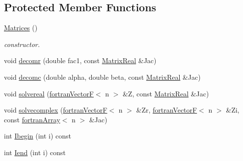 \subsection*{Protected Member Functions}
\begin{DoxyCompactItemize}
\item 
\hyperlink{classodes_1_1Matrices_3_01false_00_01true_00_01n_00_01nsub_00_01nsup_01_4_aceb158d0871ec7d9a8a739dfb202545b}{Matrices} ()
\begin{DoxyCompactList}\small\item\em constructor. \end{DoxyCompactList}\item 
void \hyperlink{classodes_1_1Matrices_3_01false_00_01true_00_01n_00_01nsub_00_01nsup_01_4_a5570c10a9d52c573ef39c23a315a93e2}{decomr} (double fac1, const \hyperlink{classodes_1_1Matrices_3_01false_00_01true_00_01n_00_01nsub_00_01nsup_01_4_a63af1e92e4c06d6986909d7af6a9c0b9}{Matrix\-Real} \&Jac)
\item 
void \hyperlink{classodes_1_1Matrices_3_01false_00_01true_00_01n_00_01nsub_00_01nsup_01_4_a15d008b4bfcf95664aaa7ae4e9407a97}{decomc} (double alpha, double beta, const \hyperlink{classodes_1_1Matrices_3_01false_00_01true_00_01n_00_01nsub_00_01nsup_01_4_a63af1e92e4c06d6986909d7af6a9c0b9}{Matrix\-Real} \&Jac)
\item 
void \hyperlink{classodes_1_1Matrices_3_01false_00_01true_00_01n_00_01nsub_00_01nsup_01_4_afc5be522ad79bd8355612626428ff493}{solvereal} (\hyperlink{classodes_1_1fortranVectorF}{fortran\-Vector\-F}$<$ n $>$ \&Z, const \hyperlink{classodes_1_1Matrices_3_01false_00_01true_00_01n_00_01nsub_00_01nsup_01_4_a63af1e92e4c06d6986909d7af6a9c0b9}{Matrix\-Real} \&Jac)
\item 
void \hyperlink{classodes_1_1Matrices_3_01false_00_01true_00_01n_00_01nsub_00_01nsup_01_4_a445a775dd02c735734a64f82426de56d}{solvecomplex} (\hyperlink{classodes_1_1fortranVectorF}{fortran\-Vector\-F}$<$ n $>$ \&Zr, \hyperlink{classodes_1_1fortranVectorF}{fortran\-Vector\-F}$<$ n $>$ \&Zi, const \hyperlink{classodes_1_1fortranArray}{fortran\-Array}$<$ n $>$ \&Jac)
\item 
int \hyperlink{classodes_1_1Matrices_3_01false_00_01true_00_01n_00_01nsub_00_01nsup_01_4_a644087ff1a72cf68a018b0a8dd8de5bd}{Ibegin} (int i) const 
\item 
int \hyperlink{classodes_1_1Matrices_3_01false_00_01true_00_01n_00_01nsub_00_01nsup_01_4_a2e74712e03d6d2c13305aca0d9dd4c21}{Iend} (int i) const 
\end{DoxyCompactItemize}
